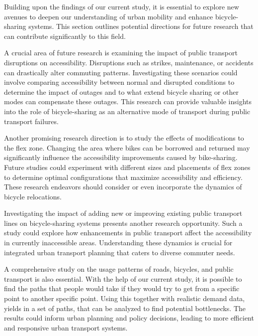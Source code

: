 Building upon the findings of our current study, it is essential to explore new avenues to deepen our understanding of urban mobility and enhance bicycle-sharing systems. 
This section outlines potential directions for future research that can contribute significantly to this field.

A crucial area of future research is examining the impact of public transport disruptions on accessibility.
Disruptions such as strikes, maintenance, or accidents can drastically alter commuting patterns. 
Investigating these scenarios could involve comparing accessibility between normal and disrupted conditions to determine the impact of outages and to what extend bicycle sharing or other modes can compensate these outages.
This research can provide valuable insights into the role of bicycle-sharing as an alternative mode of transport during public transport failures.

Another promising research direction is to study the effects of modifications to the flex zone. 
Changing the area where bikes can be borrowed and returned may significantly influence the accessibility improvements caused by bike-sharing. 
Future studies could experiment with different sizes and placements of flex zones to determine optimal configurations that maximize accessibility and efficiency.
These research endeavors should consider or even incorporate the dynamics of bicycle relocations.

Investigating the impact of adding new or improving existing public transport lines on bicycle-sharing systems presents another research opportunity. 
Such a study could explore how enhancements in public transport affect the accessibility in currently inaccessible areas.
Understanding these dynamics is crucial for integrated urban transport planning that caters to diverse commuter needs.

A comprehensive study on the usage patterns of roads, bicycles, and public transport is also essential. 
With the help of our current study, it is possible to find the paths that people would take if they would try to get from a specific point to another specific point.
Using this together with realistic demand data, yields in a set of paths, that can be analyzed to find potential bottlenecks.
The results could inform urban planning and policy decisions, leading to more efficient and responsive urban transport systems.

